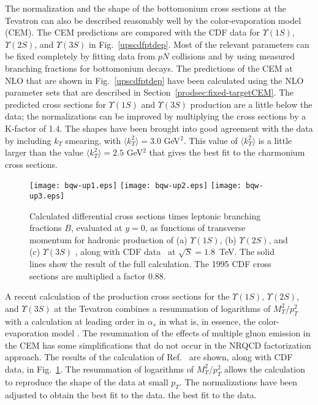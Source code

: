 The normalization and the shape of the bottomonium cross sections at the
Tevatron can also be described reasonably well by the color-evaporation
model (CEM).  The CEM predictions are compared
with the CDF data for $\Upsilon(1S)$, $\Upsilon(2S)$, and
$\Upsilon(3S)$ in Fig.~\ref{upscdfptdep}. Most of the relevant
parameters can be fixed completely by fitting data from $pN$
collisions and by using measured branching fractions for bottomonium
decays.  The predictions of the CEM at NLO that are shown in
Fig.~\ref{upscdfptdep} have been calculated using the NLO parameter
sets that are described in Section~\ref{prodsec:fixed-targetCEM}.  The
predicted cross sections for $\Upsilon(1S)$ and $\Upsilon(3S)$
production are a little below the data; the normalizations can be
improved by multiplying the cross sections by a K-factor of 1.4.  The
shapes have been brought into good agreement with the data by
including $k_T$ smearing, with $\langle k_T^2\rangle = 3.0$
GeV$^2$.  This value of $\langle k_T^2\rangle$ is a little larger
than the value $\langle k_T^2\rangle = 2.5$ GeV$^2$ that gives the
best fit to the charmonium cross sections.  

\begin{figure}
\centerline{\texttt{[image: bqw-up1.eps]}
\hfil       \texttt{[image: bqw-up2.eps]}
\hfil       \texttt{[image: bqw-up3.eps]}}
\caption{Calculated differential cross sections times leptonic branching
fractions $B$, evaluated at $y = 0$, as functions of transverse momentum
for hadronic production of (a) $\Upsilon(1S)$, (b) $\Upsilon(2S)$, and
(c) $\Upsilon(3S)$ \cite{Berger:2004cc}, along with CDF
data~\cite{Abe:1995an,Acosta:2001gv} at $\sqrt S = 1.8$~TeV.  The solid lines
show the result of the full calculation. The 1995 CDF cross sections are
multiplied a factor $0.88$.}
\label{fig:berger-qiu-wang}
\end{figure}

A recent calculation of the production cross sections for the
$\Upsilon(1S)$, $\Upsilon(2S)$, and $\Upsilon(3S)$ at the Tevatron
combines a resummation of logarithms of $M_{\Upsilon}^2/p_T^2$ with a
calculation at leading order in $\alpha_s$ in what is, in essence, the
color-evaporation model \cite{Berger:2004cc}. 
The resummation of the effects of multiple gluon 
emission in the CEM has some simplifications that do not occur in 
the NRQCD factorization approach.
The results of the calculation of Ref.~\cite{Berger:2004cc} are shown, 
along with CDF data, in Fig.~\ref{fig:berger-qiu-wang}. The resummation 
of logarithms of $M_{\Upsilon}^2/p_T^2$ allows the calculation to 
reproduce the shape of the data at small $p_T$. The normalizations have 
been adjusted to obtain the best fit to the data.
the best fit to the data.

